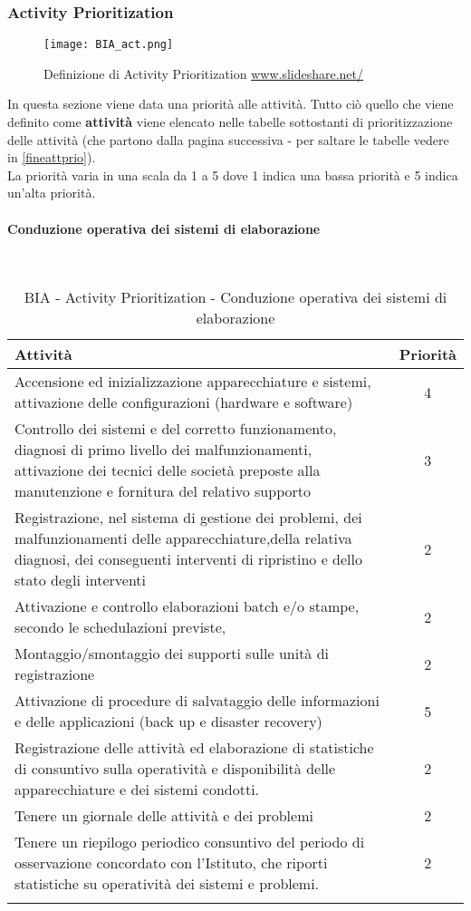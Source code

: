 \newpage
\subsubsection{Activity Prioritization}
\begin{figure}[H]
\centering
\texttt{[image: BIA\_act.png]}
\caption{Definizione di Activity Prioritization \href{https://www.slideshare.net/TheBCEye/isos-newest-standard-the-bia-iso-22317}{www.slideshare.net/}}
\end{figure}

In questa sezione viene data una priorità alle attività. Tutto ciò quello che viene definito come \textbf{attività} viene elencato nelle tabelle sottostanti di prioritizzazione delle attività (che partono dalla pagina successiva - per saltare le tabelle vedere in \ref{fineattprio}).\\
La priorità varia in una scala da 1 a 5 dove 1 indica una bassa priorità e 5 indica un'alta priorità.\\

\paragraph{Conduzione operativa dei sistemi di elaborazione}
\textcolor{white}{.} \\
\renewcommand\arraystretch{1,3}
\begin{longtable}{p{12cm} c }
\toprule
\textbf{Attività} & \textbf{Priorità} \\
\toprule
Accensione ed inizializzazione apparecchiature e sistemi, attivazione delle configurazioni (hardware e software)  & 4 \\
Controllo   dei   sistemi   e   del   corretto   funzionamento,   diagnosi   di   primo   livello   dei malfunzionamenti,  attivazione  dei  tecnici  delle  società  preposte  alla  manutenzione  e fornitura del relativo supporto  & 3 \\
Registrazione,   nel   sistema   di   gestione   dei   problemi,   dei   malfunzionamenti   delle 
apparecchiature,della relativa diagnosi, dei conseguenti interventi di ripristino e dello stato degli interventi & 2 \\
Attivazione  e  controllo  elaborazioni  batch  e/o  stampe,  secondo  le  schedulazioni previste,  & 2 \\
Montaggio/smontaggio dei supporti sulle unità di registrazione & 2 \\ 
Attivazione di procedure di salvataggio delle informazioni e delle applicazioni (back up e disaster recovery)  
 & 5 \\
Registrazione delle attività ed elaborazione di statistiche di consuntivo sulla operatività e disponibilità delle apparecchiature e dei sistemi condotti.  & 2 \\
Tenere un giornale delle attività e dei problemi &2 \\
Tenere un riepilogo periodico consuntivo del periodo di osservazione concordato con l’Istituto, che riporti  statistiche  su  operatività  dei  sistemi  e  problemi. & 2 \\
\bottomrule
\caption{BIA - Activity Prioritization - Conduzione operativa dei sistemi di elaborazione}
\end{longtable}

